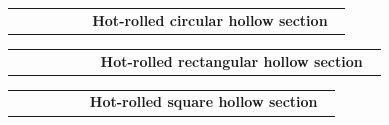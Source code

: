 \documentclass[11pt]{article}
\makeatletter
\newcommand{\ExampleRow}[3]{%
  \begin{tabular}{@{}m{0.22\linewidth}m{0.74\linewidth}@{}}
    \begin{tikzpicture}[baseline=(current bounding box.center)]
      #3
    \end{tikzpicture}
    &
    \textbf{#1}\par
    \vspace{2pt}
    {\raggedright\ttfamily\scriptsize\detokenize{#2}\par}
  \end{tabular}
  \par\vspace{8mm}
}
\makeatother
\begin{document}
\ExampleRow
  {Hot-rolled circular hollow section}
  {\TikZSectionsHRSCHS[radius=20, thickness=3, scale=0.14]}
  {\TikZSectionsHRSCHS[radius=20, thickness=3, scale=0.14]}

\ExampleRow
  {Hot-rolled rectangular hollow section}
  {\TikZSectionsHRSRHS[depth=50, width=35, thickness=3, root radius=4, scale=0.14]}
  {\TikZSectionsHRSRHS[depth=50, width=35, thickness=3, root radius=4, scale=0.14]}

\ExampleRow
  {Hot-rolled square hollow section}
  {\TikZSectionsHRSSHS[width=40, thickness=3, root radius=4, scale=0.14]}
  {\TikZSectionsHRSSHS[width=40, thickness=3, root radius=4, scale=0.14]}
\end{document}
